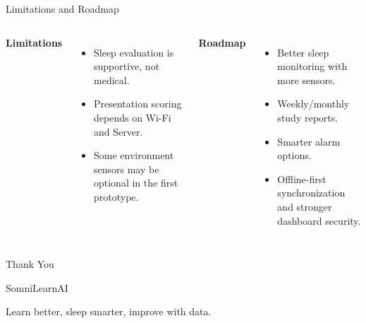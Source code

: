 ﻿\documentclass[aspectratio=169]{beamer}
\begin{document}
\begin{frame}[shrink=4]{Limitations and Roadmap}
  \begin{columns}
    \textbf{Limitations}
    \begin{itemize}
      \item Sleep evaluation is supportive, not medical.
      \item Presentation scoring depends on Wi-Fi and Server.
      \item Some environment sensors may be optional in the first prototype.
    \end{itemize}
    \textbf{Roadmap}
    \begin{itemize}
      \item Better sleep monitoring with more sensors.
      \item Weekly/monthly study reports.
      \item Smarter alarm options.
      \item Offline-first synchronization and stronger dashboard security.
    \end{itemize}
  \end{columns}
\end{frame}

\begin{frame}
  \begin{center}
    \Huge Thank You
    \vspace{0.6cm}

    \Large SomniLearnAI
    \vspace{0.2cm}

    \normalsize Learn better, sleep smarter, improve with data.
  \end{center}
\end{frame}
\end{document}
